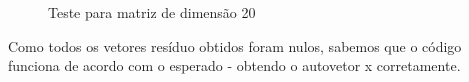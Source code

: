 \documentclass[12pt, a4paper]{article} %
\begin{document}
        \begin{figure}[H]
            \centering
            \hfill
            \caption{Teste para matriz de dimensão 20}
        \end{figure}

        Como todos os vetores res\'iduo obtidos foram nulos, sabemos que o c\'odigo funciona de acordo com o esperado - obtendo o autovetor x corretamente.
        
\end{document}
